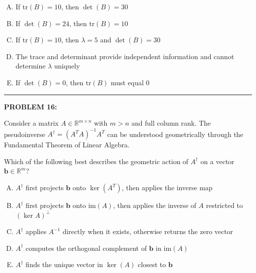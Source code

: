 \documentclass[12pt]{amsart}
\newcommand{\divider}{
  \vspace{-1em} %
  \noindent
  \raisebox{-0.15ex}{\textbullet}%
  \hspace{0.5em}%
  \rule[0.5ex]{0.95\textwidth}{1.0pt}%
  \hspace{0.5em}%
  \raisebox{-0.15ex}{\textbullet}%
  \vspace{0em} %
}
\begin{document}
\begin{enumerate}[(A)]
\item If $\text{tr}(B) = 10$, then $\det(B) = 30$
\item If $\det(B) = 24$, then $\text{tr}(B) = 10$
\item If $\text{tr}(B) = 10$, then $\lambda = 5$ and $\det(B) = 30$
\item The trace and determinant provide independent information and cannot determine $\lambda$ uniquely
\item If $\det(B) = 0$, then $\text{tr}(B)$ must equal $0$
\end{enumerate}


\divider
\newpage

{\bf PROBLEM 16:}

Consider a matrix $A \in \mathbb{R}^{m \times n}$ with $m > n$ and full column rank. The pseudoinverse $A^{\dagger} = (A^TA)^{-1}A^T$ can be understood geometrically through the Fundamental Theorem of Linear Algebra.

Which of the following best describes the geometric action of $A^{\dagger}$ on a vector $\mathbf{b} \in \mathbb{R}^m$?

\begin{enumerate}[(A)]
\item $A^{\dagger}$ first projects $\mathbf{b}$ onto $\ker(A^T)$, then applies the inverse map
\item $A^{\dagger}$ first projects $\mathbf{b}$ onto $\text{im}(A)$, then applies the inverse of $A$ restricted to $(\ker A)^{\perp}$
\item $A^{\dagger}$ applies $A^{-1}$ directly when it exists, otherwise returns the zero vector
\item $A^{\dagger}$ computes the orthogonal complement of $\mathbf{b}$ in $\text{im}(A)$
\item $A^{\dagger}$ finds the unique vector in $\ker(A)$ closest to $\mathbf{b}$
\end{enumerate}
\end{document}
